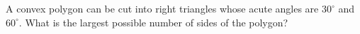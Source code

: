 A convex polygon can be cut into right triangles whose acute angles are $30^\circ$ and $60^\circ$. What is the largest possible number of sides of the polygon?
